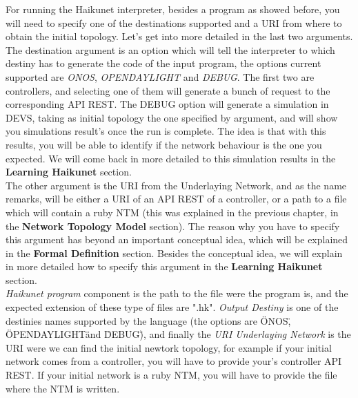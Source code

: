 For running the Haikunet interpreter, besides a program as showed before, you will need to specify one of the destinations supported and a URI from where to obtain the initial topology. Let's get into more detailed in the last two arguments.\\
The destination argument is an option which will tell the interpreter to which destiny has to generate the code of the input program, the options current supported are \textit{ONOS}, \textit{OPENDAYLIGHT} and \textit{DEBUG}. The first two are controllers, and selecting one of them will generate a bunch of request to the corresponding API REST. The DEBUG option will generate a simulation in DEVS, taking as initial topology the one specified by argument, and will show you simulations result's once the run is complete. The idea is that with this results, you will be able to identify if the network behaviour is the one you expected. We will come back in more detailed to this simulation results in the \textbf{Learning Haikunet} section.\\
The other argument is the URI from the Underlaying Network, and as the name remarks, will be either a URI of an API REST of a controller, or a path to a file which will contain a ruby NTM (this was explained in the previous chapter, in the \textbf{Network Topology Model} section). The reason why you have to specify this argument has beyond an important conceptual idea, which will be explained in the \textbf{Formal Definition} section. Besides the conceptual idea, we will explain in more detailed how to specify this argument in the \textbf{Learning Haikunet} section.\\

\textit{Haikunet program} component is the path to the file were the program is, and the expected extension of these type of files are ".hk". \textit{Output Destiny} is one of the destinies names supported by the language (the options are \"ONOS\", \"OPENDAYLIGHT\" and \"DEBUG\"), and finally the \textit{URI Underlaying Network} is the URI were we can find the initial newtork topology, for example if your initial network comes from a controller, you will have to provide your's controller API REST. If your initial network is a ruby NTM, you will have to provide the file where the NTM is written.\\


